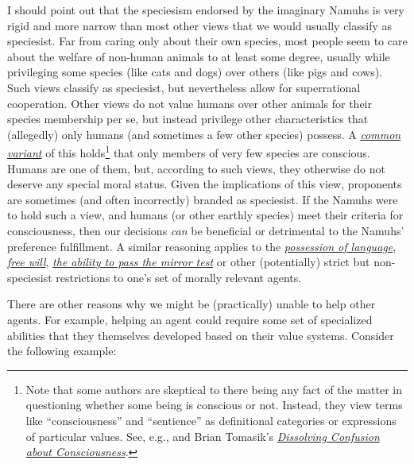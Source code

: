 I should point out that the speciesism endorsed by the imaginary Namuhs
is very rigid and more narrow than most other views that we would
usually classify as speciesist. Far from caring only about their own
species, most people seem to care about the welfare of non-human animals
to at least some degree, usually while privileging some species (like
cats and dogs) over others (like pigs and cows). Such views classify as
speciesist, but nevertheless allow for superrational cooperation. Other
views do not value humans over other animals for their species
membership per se, but instead privilege other characteristics that
(allegedly) only humans (and sometimes a few other species) possess. A
\href{https://en.wikipedia.org/wiki/Animal_consciousness\#Philosophical_background}{\emph{common
variant}} of this holds\footnote{Note that some authors are skeptical to
  there being any fact of the matter in questioning whether some being
  is conscious or not. Instead, they view terms like ``consciousness''
  and ``sentience'' as definitional categories or expressions of
  particular values. See, e.g., \parencite{Dennett1991-es}
  and Brian Tomasik's
  \href{http://reducing-suffering.org/dissolving-confusion-about-consciousness/}{\emph{\emph{Dissolving
  Confusion about Consciousness}}}.} that only members of very few
species are conscious. Humans are one of them, but, according to such
views, they otherwise do not deserve any special moral status. Given the
implications of this view, proponents are sometimes (and often
incorrectly) branded as speciesist. If the Namuhs were to hold such a
view, and humans (or other earthly species) meet their criteria for
consciousness, then our decisions \emph{can} be beneficial or
detrimental to the Namuhs' preference fulfillment. A similar reasoning
applies to the
\href{https://en.wikipedia.org/wiki/Animal_consciousness\#Language}{\emph{possession
of language}}, \href{https://en.wikipedia.org/wiki/Free_will}{\emph{free
will}},
\href{https://en.wikipedia.org/wiki/Animal_consciousness\#Mirror_test}{\emph{the
ability to pass the mirror test}} or other (potentially) strict but
non-speciesist restrictions to one's set of morally relevant agents.

There are other reasons why we might be (practically) unable to help
other agents. For example, helping an agent could require some set of
specialized abilities that they themselves developed based on their
value systems. Consider the following example:

